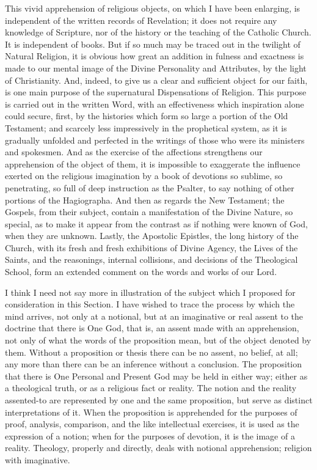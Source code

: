 This vivid apprehension of religious objects, on which I have been
enlarging, is independent of the written records of Revelation; it
does not require any knowledge of Scripture, nor of the history or the
teaching of the Catholic Church. It is independent of books. But if so
much may be traced out in the twilight of Natural Religion, it is
obvious how great an addition in fulness and exactness is made to our
mental image of the Divine Personality and Attributes, by the light of
Christianity. And, indeed, to give us a clear and sufficient object
for our faith, is one main purpose of the supernatural Dispensations
of Religion. This purpose is carried out in the written Word, with an
effectiveness which inspiration alone could secure, first, by the
histories which form so large a portion of the Old Testament; and
scarcely less impressively in the prophetical system, as it is
gradually unfolded and perfected in the writings of those who were its
ministers and spokesmen. And as the exercise of the affections
strengthens our apprehension of the object of them, it is impossible
to exaggerate the influence exerted on the religious imagination by a
book of devotions so sublime, so penetrating, so full of deep
instruction as the Psalter, to say nothing of other portions of the
Hagiographa. And then as regards the New Testament; the Gospels,
from their subject, contain a manifestation of the Divine Nature, so
special, as to make it appear from the contrast as if nothing were
known of God, when they are unknown. Lastly, the Apostolic Epistles,
the long history of the Church, with its fresh and fresh exhibitions
of Divine Agency, the Lives of the Saints, and the reasonings,
internal collisions, and decisions of the Theological School, form an
extended comment on the words and works of our Lord.

I think I need not say more in illustration of the subject which I
proposed for consideration in this Section. I have wished to trace the
process by which the mind arrives, not only at a notional, but at an
imaginative or real assent to the doctrine that there is One God, that
is, an assent made with an apprehension, not only of what the words of
the proposition mean, but of the object denoted by them. Without a
proposition or thesis there can be no assent, no belief, at all; any
more than there can be an inference without a conclusion. The
proposition that there is One Personal and Present God may be held in
either way; either as a theological truth, or as a religious fact or
reality. The notion and the reality assented-to are represented by one
and the same proposition, but serve as distinct interpretations of it.
When the proposition is apprehended for the purposes of proof,
analysis, comparison, and the like intellectual exercises, it is used
as the expression of a notion; when for the purposes of devotion, it
is the image of a reality. Theology, properly and directly, deals with notional apprehension; religion with imaginative.

